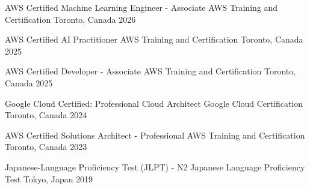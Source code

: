 
\begin{cvhonors}

  \cvhonor
    {AWS Certified Machine Learning Engineer - Associate}
    {AWS Training and Certification}
    {Toronto, Canada}
    {2026}

  \cvhonor
    {AWS Certified AI Practitioner}
    {AWS Training and Certification}
    {Toronto, Canada}
    {2025}

  \cvhonor
    {AWS Certified Developer - Associate}
    {AWS Training and Certification}
    {Toronto, Canada}
    {2025}

  \cvhonor
    {Google Cloud Certified: Professional Cloud Architect}
    {Google Cloud Certification}
    {Toronto, Canada}
    {2024}

  \cvhonor
    {AWS Certified Solutions Architect - Professional}
    {AWS Training and Certification}
    {Toronto, Canada}
    {2023}

  \cvhonor
    {Japanese-Language Proficiency Test (JLPT) - N2}
    {Japanese Language Proficiency Test}
    {Tokyo, Japan}
    {2019}

\end{cvhonors}
